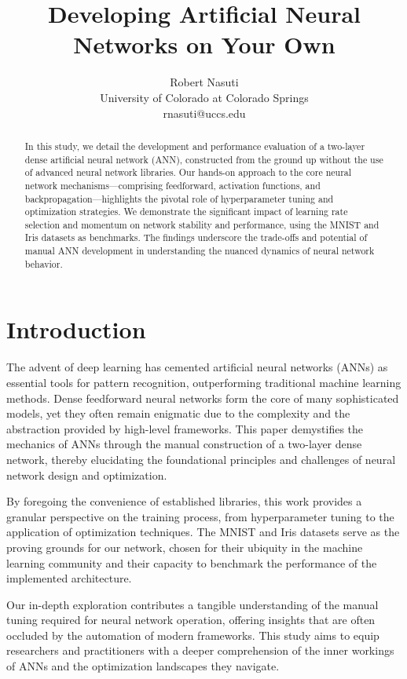 \documentclass[letterpaper]{article}
\title{Developing Artificial Neural Networks on Your Own}
\author{Robert Nasuti\\
University of Colorado at Colorado Springs\\
rnasuti@uccs.edu}
\begin{document}
\maketitle

\begin{abstract}
    In this study, we detail the development and performance evaluation of a two-layer dense artificial neural network (ANN), constructed from the ground up without the use of advanced neural network libraries. Our hands-on approach to the core neural network mechanisms—comprising feedforward, activation functions, and backpropagation—highlights the pivotal role of hyperparameter tuning and optimization strategies. We demonstrate the significant impact of learning rate selection and momentum on network stability and performance, using the MNIST and Iris datasets as benchmarks. The findings underscore the trade-offs and potential of manual ANN development in understanding the nuanced dynamics of neural network behavior.
\end{abstract}
    

\section{Introduction}
\label{sec:introduction}

The advent of deep learning has cemented artificial neural networks (ANNs) as essential tools for pattern recognition, outperforming traditional machine learning methods. Dense feedforward neural networks form the core of many sophisticated models, yet they often remain enigmatic due to the complexity and the abstraction provided by high-level frameworks. This paper demystifies the mechanics of ANNs through the manual construction of a two-layer dense network, thereby elucidating the foundational principles and challenges of neural network design and optimization.

By foregoing the convenience of established libraries, this work provides a granular perspective on the training process, from hyperparameter tuning to the application of optimization techniques. The MNIST and Iris datasets serve as the proving grounds for our network, chosen for their ubiquity in the machine learning community and their capacity to benchmark the performance of the implemented architecture. 

Our in-depth exploration contributes a tangible understanding of the manual tuning required for neural network operation, offering insights that are often occluded by the automation of modern frameworks. This study aims to equip researchers and practitioners with a deeper comprehension of the inner workings of ANNs and the optimization landscapes they navigate.
\end{document}
